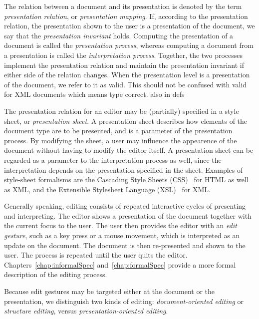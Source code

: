 The relation between a document and its presentation is denoted by the term {\em presentation relation}, or {\em presentation mapping}. If, according to the presentation relation, the presentation shown to the user is a presentation of the document, we say that the {\em presentation invariant} holds. Computing the presentation of a document is called the {\em presentation process}, whereas computing a document from a presentation is called the {\em interpretation process}. Together, the two processes implement the presentation relation and maintain the presentation invariant if either side of the relation changes.
\bc
When the presentation level is a presentation of the document, we refer to it as valid. This should not be confused with valid for XML documents which means type correct.
also in defs
\ec

The presentation relation for an editor may be (partially) specified in a style sheet, or {\em presentation sheet}. A presentation sheet describes how elements of the document type are to be presented, and is a parameter of the presentation process. By modifying the sheet, a user may influence the appearence of the document without having to modify the editor itself. A presentation sheet can be regarded as a parameter to the interpretation process as well, since the interpretation depends on the presentation specified in the sheet. Examples of style-sheet formalisms are the Cascading Style Sheets (CSS)~\cite{css2} for HTML as well as XML, and the Extensible Stylesheet Language (XSL)~\cite{xsl10} for XML.

Generally speaking, editing consists of repeated interactive cycles of presenting and interpreting. The editor shows a presentation of the document together with the current focus to the user. The user then provides the editor with an {\em edit gesture}, such as a key press or a mouse movement, which is interpreted as an update on the document. The document is then re-presented and shown to the user. The process is repeated until the user quits the editor. Chapters~\ref{chap:informalSpec} and~\ref{chap:formalSpec} provide a more formal description of the editing process.


Because edit gestures may be targeted either at the document or the presentation, we distinguish two kinds of editing:  {\em document-oriented editing} or {\em structure editing}, versus {\em presentation-oriented editing}.

